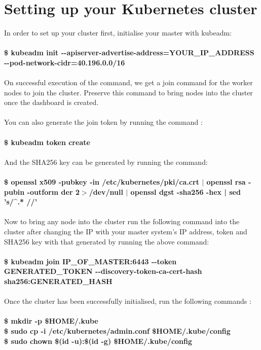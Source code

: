 \documentclass[12pt]{report}
\begin{document}
\section{Setting up your Kubernetes cluster}
\label{sec:kubeclustset}
In order to set up your cluster first, initialise your master with kubeadm:\\\\
\textbf{\$ kubeadm init  -{}-apiserver-advertise-address=YOUR\_IP\_ADDRESS    -{}-pod-network-cidr=40.196.0.0/16}\\\\
On successful execution of the command, we get a join command for the worker nodes to join the cluster. Preserve this command to bring nodes into the cluster once the dashboard is created.\\\\
You can also generate the join token by running the command :\\\\
\textbf{\$ kubeadm token create}\\\\
And the SHA256 key can be generated by running the command:\\\\
\textbf{\$ openssl x509 -pubkey -in /etc/kubernetes/pki/ca.crt $|$ openssl rsa -pubin -outform der 2$>$/dev/null $|$ openssl dgst -sha256 -hex | sed 's/\string^.* //'}\\\\
Now to bring any node into the cluster run the following command into the cluster after changing the IP with your master system’s IP address, token and SHA256 key with that generated by running the above command:\\\\
\textbf{\$ kubeadm join IP\_OF\_MASTER:6443 -{}-token GENERATED\_TOKEN -{}-discovery-token-ca-cert-hash sha256:GENERATED\_HASH}\\\\
Once the cluster has been successfully initialised, run the following commands :\\\\
\textbf{
	\$ mkdir -p \$HOME/.kube\\
	\$ sudo cp -i /etc/kubernetes/admin.conf \$HOME/.kube/config\\
	\$ sudo chown \$(id -u):\$(id -g) \$HOME/.kube/config
}
\end{document}
